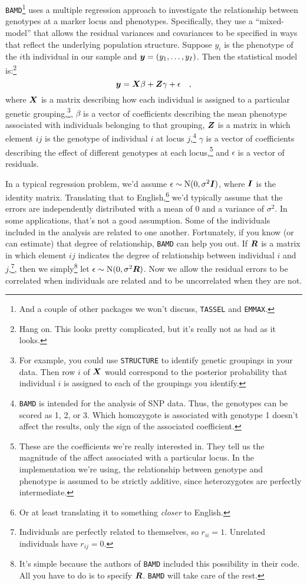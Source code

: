 \documentclass[12pt]{article}
\begin{document}
{\tt BAMD}\footnote{And a couple of other packages we won't discuss,
  {\tt TASSEL} and {\tt EMMAX}.} uses a multiple regression approach
to investigate the relationship between genotypes at a marker locus
and phenotypes. Specifically, they use a ``mixed-model'' that allows
the residual variances and covariances to be specified in ways that
reflect the underlying population structure. Suppose $y_i$ is the
phenotype of the $i$th individual in our sample and
$\mbox{\boldmath$y$} = (y_1, \dots, y_I)$. Then the statistical model
is:\footnote{Hang on. This looks pretty complicated, but it's really
  not as bad as it looks.}
\[
\mbox{\boldmath$y$} = \mbox{\boldmath$X$}\beta +
\mbox{\boldmath$Z$}\gamma + \epsilon \quad ,
\]
where $\mbox{\boldmath$X$}$ is a matrix describing how each individual
is assigned to a particular genetic grouping,\footnote{For example,
  you could use {\tt STRUCTURE} to identify genetic groupings in your
  data. Then row $i$ of $\mbox{\boldmath$X$}$ would correspond to the
  posterior probability that individual $i$ is assigned to each of the
  groupings you identify.}, $\beta$ is a vector of coefficients
describing the mean phenotype associated with individuals belonging to
that grouping, $\mbox{\boldmath$Z$}$ is a matrix in which element $ij$
is the genotype of individual $i$ at locus $j$,\footnote{{\tt BAMD} is
  intended for the analysis of SNP data. Thus, the genotypes can be
  scored as 1, 2, or 3. Which homozygote is associated with genotype 1
  doesn't affect the results, only the sign of the associated
  coefficient.} $\gamma$ is a vector of coefficients describing the
effect of different genotypes at each locus,\footnote{These are the
  coefficients we're really interested in. They tell us the magnitude
  of the affect associated with a particular locus. In the
  implementation we're using, the relationship between genotype and
  phenotype is assumed to be strictly additive, since heterozygotes
  are perfectly intermediate.} and $\epsilon$ is a vector of
residuals.

In a typical regression problem, we'd assume $\epsilon \sim
\mbox{N}(0, \sigma^2\mbox{\boldmath$I$})$, where $\mbox{\boldmath$I$}$
is the identity matrix. Translating that to English,\footnote{Or at
  least translating it to something {\it closer\/} to English.} we'd
typically assume that the errors are independently distributed with a
mean of 0 and a variance of $\sigma^2$. In some applications, that's
not a good assumption. Some of the individuals included in the
analysis are related to one another. Fortunately, if you know (or can
estimate) that degree of relationship, {\tt BAMD} can help you out. If
$\mbox{\boldmath$R$}$ is a matrix in which element $ij$ indicates the
degree of relationship between individual $i$ and
$j$,\footnote{Individuals are perfectly related to themselves, so
  $r_{ii}=1$. Unrelated individuals have $r_{ij}=0$.}, then we
simply\footnote{It's simple because the authors of {\tt BAMD} included
  this possibility in their code. All you have to do is to specify
  $\mbox{\boldmath$R$}$. {\tt BAMD} will take care of the rest.} let
$\epsilon \sim \mbox{N}(0, \sigma^2\mbox{\boldmath$R$})$. Now we allow
the residual errors to be correlated when individuals are related and
to be uncorrelated when they are not. 
\end{document}
